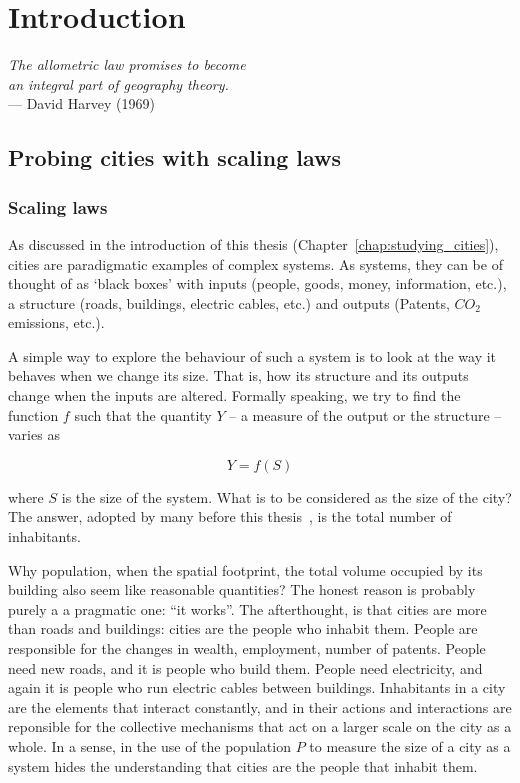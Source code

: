 \chapter{Introduction}
\label{chap:scaling_introduction}

\begin{flushright}{\slshape    
The allometric law promises to become\\
an integral part of geography theory.} \\ \medskip
--- David Harvey (1969)~\cite{Harvey:1969} 
\end{flushright}


\section{Probing cities with scaling laws}
\label{sec:probing_cities_with_scaling_laws}

\subsection{Scaling laws}
\label{sub:scaling_laws}

As discussed in the introduction of this thesis
(Chapter~\ref{chap:studying_cities}), cities are paradigmatic examples of
complex systems. As systems, they can be of thought of as `black boxes'
with inputs (people, goods, money, information, etc.), a structure (roads,
buildings, electric cables, etc.) and outputs (Patents, $CO_2$ emissions, etc.).

A simple way to explore the behaviour of such a system is to look at the way it
 behaves when we change its size. That is, how its structure and its
outputs change when the inputs are altered. Formally speaking, we try to find
the function $f$ such that the quantity $Y$ -- a measure of the output or the
structure -- varies as

\begin{equation}
    Y = f(S)
    \label{eq:functional_form}
\end{equation}

where $S$ is the size of the system. What is to be considered as the size of the
city? The answer, adopted by many before this thesis~\cite{Stewart:1949,
Bettencourt:2007}, is the total number of inhabitants. 

Why population, when the spatial footprint, the total volume occupied by its
building also seem like reasonable quantities? The honest reason is probably
purely a a pragmatic one: ``it works''. The afterthought, is that cities are
more than roads and buildings: cities are the people who inhabit them. People
are responsible for the changes in wealth, employment, number of patents. People
need new roads, and it is people who build them. People need electricity, and
again it is people who run electric cables between buildings. Inhabitants in a
city are the elements that interact constantly, and in their actions and
interactions are reponsible for the collective mechanisms that act on a larger
scale on the city as a whole.  In a sense, in the use of the population $P$ to
measure the size of a city as a system hides the understanding that cities are
the people that inhabit them.\\

